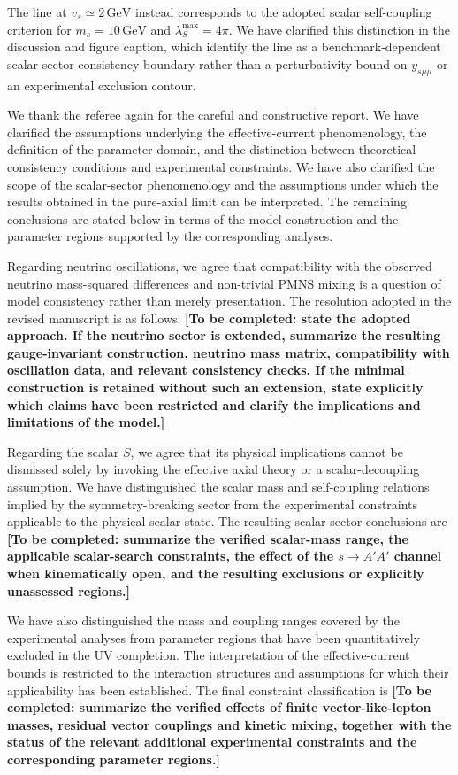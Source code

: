 \documentclass[12pt,a4paper]{article}
\begin{document}
The line at \(v_s\simeq2\,\mathrm{GeV}\) instead corresponds to the adopted scalar self-coupling criterion for \(m_s=10\,\mathrm{GeV}\) and \(\lambda_S^{\max}=4\pi\). We have clarified this distinction in the discussion and figure caption, which identify the line as a benchmark-dependent scalar-sector consistency boundary rather than a perturbativity bound on \(y_{s\mu\mu}\) or an experimental exclusion contour.

\medskip
{}

We thank the referee again for the careful and constructive report. We have clarified the assumptions underlying the effective-current phenomenology, the definition of the parameter domain, and the distinction between theoretical consistency conditions and experimental constraints. We have also clarified the scope of the scalar-sector phenomenology and the assumptions under which the results obtained in the pure-axial limit can be interpreted. The remaining conclusions are stated below in terms of the model construction and the parameter regions supported by the corresponding analyses.

Regarding neutrino oscillations, we agree that compatibility with the observed neutrino mass-squared differences and non-trivial PMNS mixing is a question of model consistency rather than merely presentation. The resolution adopted in the revised manuscript is as follows: \textbf{[To be completed: state the adopted approach. If the neutrino sector is extended, summarize the resulting gauge-invariant construction, neutrino mass matrix, compatibility with oscillation data, and relevant consistency checks. If the minimal construction is retained without such an extension, state explicitly which claims have been restricted and clarify the implications and limitations of the model.]}

Regarding the scalar \(S\), we agree that its physical implications cannot be dismissed solely by invoking the effective axial theory or a scalar-decoupling assumption. We have distinguished the scalar mass and self-coupling relations implied by the symmetry-breaking sector from the experimental constraints applicable to the physical scalar state. The resulting scalar-sector conclusions are \textbf{[To be completed: summarize the verified scalar-mass range, the applicable scalar-search constraints, the effect of the \(s\to A'A'\) channel when kinematically open, and the resulting exclusions or explicitly unassessed regions.]}

We have also distinguished the mass and coupling ranges covered by the experimental analyses from parameter regions that have been quantitatively excluded in the UV completion. The interpretation of the effective-current bounds is restricted to the interaction structures and assumptions for which their applicability has been established. The final constraint classification is \textbf{[To be completed: summarize the verified effects of finite vector-like-lepton masses, residual vector couplings and kinetic mixing, together with the status of the relevant additional experimental constraints and the corresponding parameter regions.]}
\end{document}
